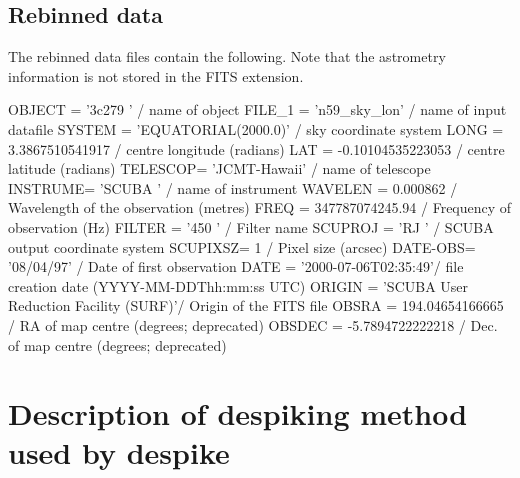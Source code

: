 \documentclass[twoside,11pt]{starlink}
\providecommand{\task}[1]{#1}
\begin{document}
\subsection{Rebinned data}

The rebinned data files contain the following. Note that the astrometry
information is not stored in the FITS extension.

\begin{terminalv}
OBJECT  = '3c279   '           / name of object
FILE_1  = 'n59_sky_lon'        / name of input datafile
SYSTEM  = 'EQUATORIAL(2000.0)' / sky coordinate system
LONG    =      3.3867510541917 / centre longitude (radians)
LAT     =    -0.10104535223053 / centre latitude (radians)
TELESCOP= 'JCMT-Hawaii'        / name of telescope
INSTRUME= 'SCUBA   '           / name of instrument
WAVELEN =             0.000862 / Wavelength of the observation (metres)
FREQ    =      347787074245.94 / Frequency of observation (Hz)
FILTER  = '450     '           / Filter name
SCUPROJ = 'RJ      '           / SCUBA output coordinate system
SCUPIXSZ=                    1 / Pixel size (arcsec)
DATE-OBS= '08/04/97'           / Date of first observation
DATE    = '2000-07-06T02:35:49'/ file creation date (YYYY-MM-DDThh:mm:ss UTC)
ORIGIN  = 'SCUBA User Reduction Facility (SURF)'/  Origin of the FITS file
OBSRA   =      194.04654166665 / RA of map centre (degrees; deprecated)
OBSDEC  =     -5.7894722222218 / Dec. of map centre (degrees; deprecated)
\end{terminalv}


\section{Description of despiking method used by \task{despike}\label{despiking_eg}}
\end{document}
